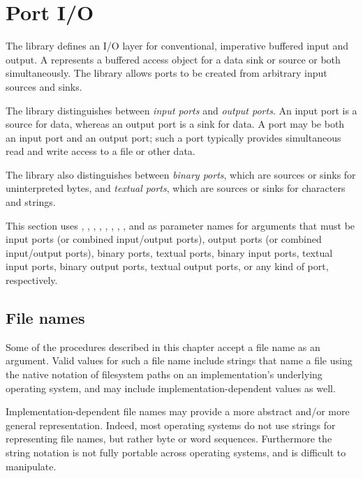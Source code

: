 \section{Port I/O}
\label{portsiosection}

The  library defines an I/O layer for
conventional, imperative buffered input and output.
A  represents a buffered access object
for a data sink or source or both simultaneously.
The library allows ports to be created from arbitrary input sources
and sinks.

The  library distinguishes between \textit{input
  ports} and \textit{output
  ports}.  An input port is a source for data,
whereas an output port is a sink for data.  A port may be both an
input port and an output port; such a port typically provides
simultaneous read and write access to a file or other data.

The  library also distinguishes between
\textit{binary ports}, which are sources
or sinks for uninterpreted bytes, and
\textit{textual ports}, which are sources
or sinks for characters and strings.

This section uses , ,
, ,
, ,
, ,
and  as
parameter names for arguments that must be input ports (or combined
input/output ports), output ports (or combined input/output ports),
binary ports, textual ports, binary input ports, textual input ports,
binary output ports, textual output ports, or any kind of port,
respectively.

\subsection{File names}
\label{filenamesection}

Some of the procedures described in this chapter accept a file name as an
argument. Valid values for such a file name include strings that name a file
using the native notation of filesystem paths on an implementation's
underlying operating system, and may include implementation-dependent
values as well.

\begin{rationale}
Implementation-dependent file names may provide a more
abstract and/or more general representation. Indeed, most operating
systems do not use strings for representing file names, but rather byte
or word sequences.
Furthermore the string notation is not fully portable across operating
systems, and is difficult to manipulate.
\end{rationale}


